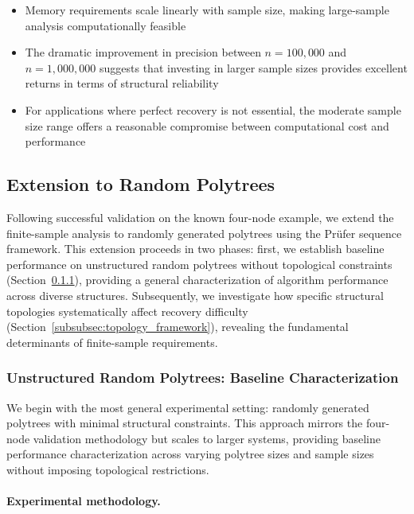 \documentclass[11pt,a4paper]{article}
\numberwithin{equation}{section}
\begin{document}
\begin{itemize}
\item Memory requirements scale linearly with sample size, making large-sample analysis computationally feasible
\item The dramatic improvement in precision between $n = 100{,}000$ and $n = 1{,}000{,}000$ suggests that investing in larger sample sizes provides excellent returns in terms of structural reliability
\item For applications where perfect recovery is not essential, the moderate sample size range offers a reasonable compromise between computational cost and performance
\end{itemize}

\subsection{Extension to Random Polytrees}
\label{subsec:random_polytree_extension}

Following successful validation on the known four-node example, we extend the finite-sample analysis to randomly generated polytrees using the Prüfer sequence framework. This extension proceeds in two phases: first, we establish baseline performance on unstructured random polytrees without topological constraints (Section~\ref{subsubsec:unstructured_random}), providing a general characterization of algorithm performance across diverse structures. Subsequently, we investigate how specific structural topologies systematically affect recovery difficulty (Section~\ref{subsubsec:topology_framework}), revealing the fundamental determinants of finite-sample requirements.

\subsubsection{Unstructured Random Polytrees: Baseline Characterization}
\label{subsubsec:unstructured_random}

We begin with the most general experimental setting: randomly generated polytrees with minimal structural constraints. This approach mirrors the four-node validation methodology but scales to larger systems, providing baseline performance characterization across varying polytree sizes and sample sizes without imposing topological restrictions.

\paragraph{Experimental methodology.}
\end{document}
